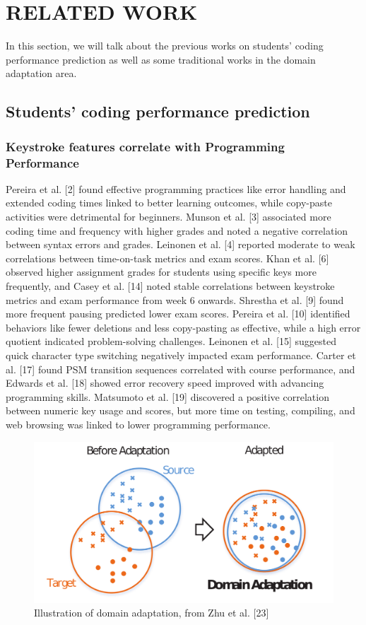 \documentclass[sigconf,final]{acmart}
\begin{document}
\section{RELATED WORK}
In this section, we will talk about the previous works on students’ coding performance prediction as well as some traditional works in the domain adaptation area.

\subsection{Students’ coding performance prediction}
\subsubsection{Keystroke features correlate with Programming Performance}

Pereira et al. [2] found effective programming practices like error handling and extended coding times linked to better learning outcomes, while copy-paste activities were detrimental for beginners. Munson et al. [3] associated more coding time and frequency with higher grades and noted a negative correlation between syntax errors and grades. Leinonen et al. [4] reported moderate to weak correlations between time-on-task metrics and exam scores. Khan et al. [6] observed higher assignment grades for students using specific keys more frequently, and Casey et al. [14] noted stable correlations between keystroke metrics and exam performance from week 6 onwards. Shrestha et al. [9] found more frequent pausing predicted lower exam scores. Pereira et al. [10] identified behaviors like fewer deletions and less copy-pasting as effective, while a high error quotient indicated problem-solving challenges. Leinonen et al. [15] suggested quick character type switching negatively impacted exam performance. Carter et al. [17] found PSM transition sequences correlated with course performance, and Edwards et al. [18] showed error recovery speed improved with advancing programming skills. Matsumoto et al. [19] discovered a positive correlation between numeric key usage and scores, but more time on testing, compiling, and web browsing was linked to lower programming performance.
\begin{figure}[ht]
  \centering
  \includegraphics[width=\linewidth]{domain.png}
  \caption{Illustration of domain adaptation, from Zhu et al. [23]}
  \label{fig:imglabel}
\end{figure}
\end{document}
